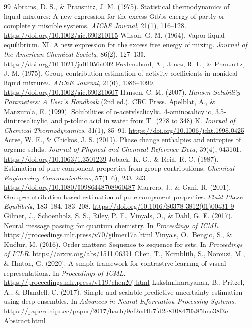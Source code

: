 \documentclass[11pt]{article}
\begin{document}
\begin{thebibliography}{99}
   Abrams, D. S., \& Prausnitz, J. M. (1975). Statistical thermodynamics of liquid mixtures: A new expression for the excess Gibbs energy of partly or completely miscible systems. \textit{AIChE Journal}, 21(1), 116--128. \url{https://doi.org/10.1002/aic.690210115}
   Wilson, G. M. (1964). Vapor-liquid equilibrium. XI. A new expression for the excess free energy of mixing. \textit{Journal of the American Chemical Society}, 86(2), 127--130. \url{https://doi.org/10.1021/ja01056a002}
   Fredenslund, A., Jones, R. L., \& Prausnitz, J. M. (1975). Group-contribution estimation of activity coefficients in nonideal liquid mixtures. \textit{AIChE Journal}, 21(6), 1086--1099. \url{https://doi.org/10.1002/aic.690210607}
   Hansen, C. M. (2007). \textit{Hansen Solubility Parameters: A User's Handbook} (2nd ed.). CRC Press.
   Apelblat, A., \& Manzurola, E. (1999). Solubilities of o-acetylsalicylic, 4-aminosalicylic, 3,5-dinitrosalicylic, and p-toluic acid in water from T=(278 to 348) K. \textit{Journal of Chemical Thermodynamics}, 31(1), 85--91. \url{https://doi.org/10.1006/jcht.1998.0425}
   Acree, W. E., \& Chickos, J. S. (2010). Phase change enthalpies and entropies of organic solids. \textit{Journal of Physical and Chemical Reference Data}, 39(4), 043101. \url{https://doi.org/10.1063/1.3501239}
   Joback, K. G., \& Reid, R. C. (1987). Estimation of pure-component properties from group-contributions. \textit{Chemical Engineering Communications}, 57(1--6), 233--243. \url{https://doi.org/10.1080/00986448708960487}
   Marrero, J., \& Gani, R. (2001). Group-contribution based estimation of pure component properties. \textit{Fluid Phase Equilibria}, 183--184, 183--208. \url{https://doi.org/10.1016/S0378-3812(01)00431-9}
   Gilmer, J., Schoenholz, S. S., Riley, P. F., Vinyals, O., \& Dahl, G. E. (2017). Neural message passing for quantum chemistry. In \textit{Proceedings of ICML}. \url{https://proceedings.mlr.press/v70/gilmer17a.html}
   Vinyals, O., Bengio, S., \& Kudlur, M. (2016). Order matters: Sequence to sequence for sets. In \textit{Proceedings of ICLR}. \url{https://arxiv.org/abs/1511.06391}
   Chen, T., Kornblith, S., Norouzi, M., \& Hinton, G. (2020). A simple framework for contrastive learning of visual representations. In \textit{Proceedings of ICML}. \url{https://proceedings.mlr.press/v119/chen20j.html}
   Lakshminarayanan, B., Pritzel, A., \& Blundell, C. (2017). Simple and scalable predictive uncertainty estimation using deep ensembles. In \textit{Advances in Neural Information Processing Systems}. \url{https://papers.nips.cc/paper/2017/hash/9ef2ed4b7fd2c810847ffa85bce38f3c-Abstract.html}

\end{thebibliography}
\end{document}
